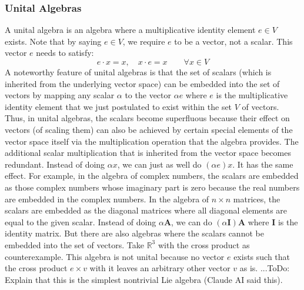 \subsubsection{Unital Algebras}
A unital algebra is an algebra where a multiplicative identity element $e \in V$ exists. Note that by saying $e \in V$, we require $e$ to be a vector, not a scalar. This vector $e$ needs to satisfy:
\begin{equation}
 e \cdot x = x, \quad x \cdot e = x \qquad \forall x \in V
\end{equation}
A noteworthy feature of unital algebras is that the set of scalars (which is inherited from the underlying vector space) can be embedded into the set of vectors by mapping any scalar $\alpha$ to the vector $\alpha e$ where $e$ is the multiplicative identity element that we just postulated to exist within the set $V$ of vectors. Thus, in unital algebras, the scalars become superfluous because their effect on vectors (of scaling them) can also be achieved by certain special elements of the vector space itself via the multiplication operation that the algebra provides. The additional scalar multiplication that is inherited from the vector space becomes redundant. Instead of doing $\alpha x$, we can just as well do $(\alpha e) x$. It has the same effect. For example, in the algebra of complex numbers, the scalars are embedded as those complex numbers whose imaginary part is zero because the real numbers are embedded in the complex numbers.  In the algebra of $n \times n$ matrices, the scalars are embedded as the diagonal matrices where all diagonal elements are equal to the given scalar. Instead of doing $\alpha \mathbf{A}$, we can do $(\alpha \mathbf{I}) \mathbf{A}$ where $\mathbf{I}$ is the identity matrix. But there are also algebras where the scalars cannot be embedded into the set of vectors. Take $\mathbb{R}^3$ with the cross product as counterexample. This algebra is not unital because no vector $e$ exists such that the cross product $e \times v$ with it leaves an arbitrary other vector $v$ as is. ...ToDo: Explain that this is the simplest nontrivial Lie algebra (Claude AI said this).



